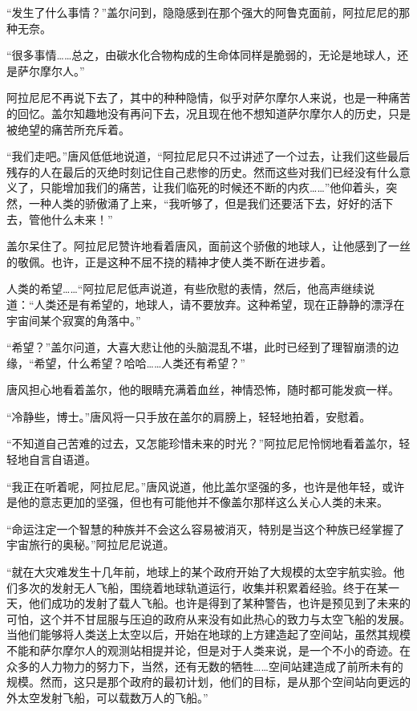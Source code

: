 “发生了什么事情？”盖尔问到，隐隐感到在那个强大的阿鲁克面前，阿拉尼尼的那种无奈。

“很多事情……总之，由碳水化合物构成的生命体同样是脆弱的，无论是地球人，还是萨尔摩尔人。”

阿拉尼尼不再说下去了，其中的种种隐情，似乎对萨尔摩尔人来说，也是一种痛苦的回忆。盖尔知趣地没有再问下去，况且现在他不想知道萨尔摩尔人的历史，只是被绝望的痛苦所充斥着。

“我们走吧。”唐风低低地说道，“阿拉尼尼只不过讲述了一个过去，让我们这些最后残存的人在最后的灭绝时刻记住自己悲惨的历史。然而这些对我们已经没有什么意义了，只能增加我们的痛苦，让我们临死的时候还不断的内疚……”他仰着头，突然，一种人类的骄傲涌了上来，“我听够了，但是我们还要活下去，好好的活下去，管他什么未来！”

盖尔呆住了。阿拉尼尼赞许地看着唐风，面前这个骄傲的地球人，让他感到了一丝的敬佩。也许，正是这种不屈不挠的精神才使人类不断在进步着。

人类的希望……“阿拉尼尼低声说道，有些欣慰的表情，然后，他高声继续说道：“人类还是有希望的，地球人，请不要放弃。这种希望，现在正静静的漂浮在宇宙间某个寂寞的角落中。”

“希望？”盖尔问道，大喜大悲让他的头脑混乱不堪，此时已经到了理智崩溃的边缘，“希望，什么希望？哈哈……人类还有希望？”

唐风担心地看着盖尔，他的眼睛充满着血丝，神情恐怖，随时都可能发疯一样。

“冷静些，博士。”唐风将一只手放在盖尔的肩膀上，轻轻地拍着，安慰着。

“不知道自己苦难的过去，又怎能珍惜未来的时光？”阿拉尼尼怜悯地看着盖尔，轻轻地自言自语道。

“我正在听着呢，阿拉尼尼。”唐风说道，他比盖尔坚强的多，也许是他年轻，或许是他的意志更加的坚强，但也有可能他并不像盖尔那样这么关心人类的未来。

“命运注定一个智慧的种族并不会这么容易被消灭，特别是当这个种族已经掌握了宇宙旅行的奥秘。”阿拉尼尼说道。

“就在大灾难发生十几年前，地球上的某个政府开始了大规模的太空宇航实验。他们多次的发射无人飞船，围绕着地球轨道运行，收集并积累着经验。终于在某一天，他们成功的发射了载人飞船。也许是得到了某种警告，也许是预见到了未来的可怕，这个并不甘屈服与压迫的政府从来没有如此热心的致力与太空飞船的发展。当他们能够将人类送上太空以后，开始在地球的上方建造起了空间站，虽然其规模不能和萨尔摩尔人的观测站相提并论，但是对于人类来说，是一个不小的奇迹。在众多的人力物力的努力下，当然，还有无数的牺牲……空间站建造成了前所未有的规模。然而，这只是那个政府的最初计划，他们的目标，是从那个空间站向更远的外太空发射飞船，可以载数万人的飞船。”

